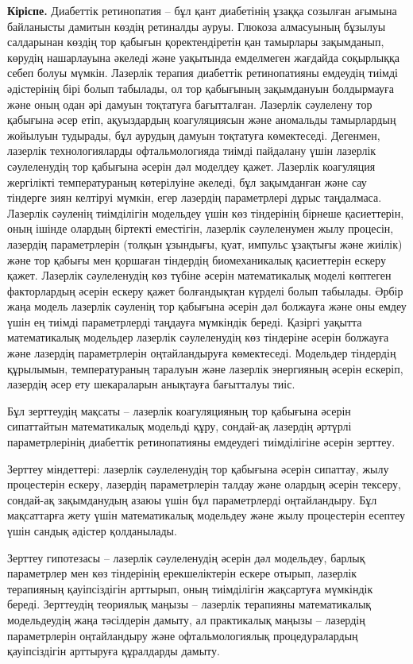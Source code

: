 {\bfseries Кіріспе.} Диабеттік ретинопатия -- бұл қант диабетінің ұзаққа
созылған ағымына байланысты дамитын көздің ретиналды ауруы. Глюкоза
алмасуының бұзылуы салдарынан көздің тор қабығын қоректендіретін қан
тамырлары зақымданып, көрудің нашарлауына әкеледі және уақытында
емделмеген жағдайда соқырлыққа себеп болуы мүмкін. Лазерлік терапия
диабеттік ретинопатияны емдеудің тиімді әдістерінің бірі болып табылады,
ол тор қабығының зақымдануын болдырмауға және оның одан әрі дамуын
тоқтатуға бағытталған. Лазерлік сәулелену тор қабығына әсер етіп,
ақуыздардың коагуляциясын және аномальды тамырлардың жойылуын тудырады,
бұл аурудың дамуын тоқтатуға көмектеседі. Дегенмен, лазерлік
технологияларды офтальмологияда тиімді пайдалану үшін лазерлік
сәулеленудің тор қабығына әсерін дәл моделдеу қажет. Лазерлік коагуляция
жергілікті температураның көтерілуіне әкеледі, бұл зақымданған және сау
тіндерге зиян келтіруі мүмкін, егер лазердің параметрлері дұрыс
таңдалмаса. Лазерлік сәуленің тиімділігін модельдеу үшін көз тіндерінің
бірнеше қасиеттерін, оның ішінде олардың біртекті еместігін, лазерлік
сәулеленумен жылу процесін, лазердің параметрлерін (толқын ұзындығы,
қуат, импульс ұзақтығы және жиілік) және тор қабығы мен қоршаған
тіндердің биомеханикалық қасиеттерін ескеру қажет. Лазерлік сәулеленудің
көз түбіне әсерін математикалық моделі көптеген факторлардың әсерін
ескеру қажет болғандықтан күрделі болып табылады. Әрбір жаңа модель
лазерлік сәуленің тор қабығына әсерін дәл болжауға және оны емдеу үшін
ең тиімді параметрлерді таңдауға мүмкіндік береді. Қазіргі уақытта
математикалық модельдер лазерлік сәулеленудің көз тіндеріне әсерін
болжауға және лазердің параметрлерін оңтайландыруға көмектеседі.
Модельдер тіндердің құрылымын, температураның таралуын және лазерлік
энергияның әсерін ескеріп, лазердің әсер ету шекараларын анықтауға
бағытталуы тиіс.

Бұл зерттеудің мақсаты -- лазерлік коагуляцияның тор қабығына әсерін
сипаттайтын математикалық модельді құру, сондай-ақ лазердің әртүрлі
параметрлерінің диабеттік ретинопатияны емдеудегі тиімділігіне әсерін
зерттеу.

Зерттеу міндеттері: лазерлік сәулеленудің тор қабығына әсерін сипаттау,
жылу процестерін ескеру, лазердің параметрлерін талдау және олардың
әсерін тексеру, сондай-ақ зақымданудың азаюы үшін бұл параметрлерді
оңтайландыру. Бұл мақсаттарға жету үшін математикалық модельдеу және
жылу процестерін есептеу үшін сандық әдістер қолданылады.

Зерттеу гипотезасы -- лазерлік сәулеленудің әсерін дәл модельдеу, барлық
параметрлер мен көз тіндерінің ерекшеліктерін ескере отырып, лазерлік
терапияның қауіпсіздігін арттырып, оның тиімділігін жақсартуға мүмкіндік
береді. Зерттеудің теориялық маңызы -- лазерлік терапияны математикалық
модельдеудің жаңа тәсілдерін дамыту, ал практикалық маңызы -- лазердің
параметрлерін оңтайландыру және офтальмологиялық процедуралардың
қауіпсіздігін арттыруға құралдарды дамыту.

